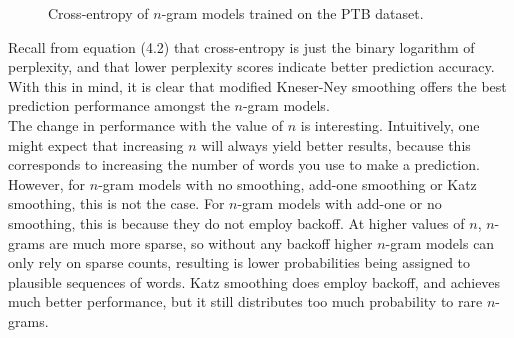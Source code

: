 \documentclass[a4paper, 12pt]{report}
\begin{document}
\begin{figure}[h]
\caption{Cross-entropy of $n$-gram models trained on the PTB dataset.}
\end{figure}

Recall from equation (4.2) that cross-entropy is just the binary logarithm of perplexity, and that lower perplexity scores indicate better prediction accuracy. With this in mind, it is clear that modified Kneser-Ney smoothing offers the best prediction performance amongst the $n$-gram models. \\

The change in performance with the value of $n$ is interesting. Intuitively, one might expect that increasing $n$ will always yield better results, because this corresponds to increasing the number of words you use to make a prediction. However, for $n$-gram models with no smoothing, add-one smoothing or Katz smoothing, this is not the case. For $n$-gram models with add-one or no smoothing, this is because they do not employ backoff. At higher values of $n$, $n$-grams are much more sparse, so without any backoff higher $n$-gram models can only rely on sparse counts, resulting is lower probabilities being assigned to plausible sequences of words. Katz smoothing does employ backoff, and achieves much better performance, but it still distributes too much probability to rare $n$-grams.
\end{document}
